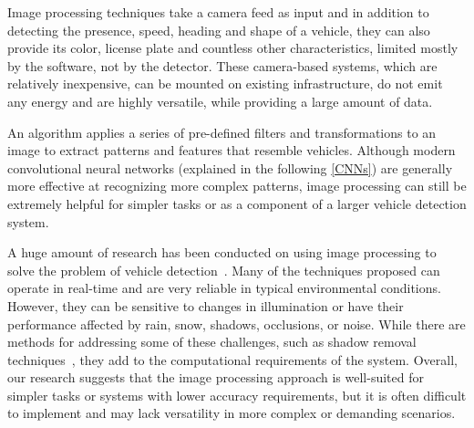 





Image processing techniques take a camera feed as input and in addition to
detecting the presence, speed, heading and shape of a vehicle, they can also
provide its color, license plate and countless other characteristics, limited
mostly by the software, not by the detector. These camera-based systems, which
are relatively inexpensive, can be mounted on existing infrastructure, do not
emit any energy and are highly versatile, while providing a large amount of
data.

An algorithm applies a series of pre-defined filters and transformations to an
image to extract patterns and features that resemble vehicles. Although modern
convolutional neural networks (explained in the following \autoref{CNNs}) are
generally more effective at recognizing more complex patterns, image processing
can still be extremely helpful for simpler tasks or as a component of a larger
vehicle detection system.

A huge amount of research has been conducted on using image processing to solve
the problem of vehicle detection~\cite{ImageProcessingOverview}. Many of the
techniques proposed can operate in real-time and are very reliable in typical
environmental conditions. However, they can be sensitive to changes in
illumination or have their performance affected by rain, snow, shadows,
occlusions, or noise. While there are methods for addressing some of these
challenges, such as shadow removal techniques~\cite{ShadowRemoval}, they add to
the computational requirements of the system. Overall, our research suggests
that the image processing approach is well-suited for simpler tasks or systems
with lower accuracy requirements, but it is often difficult to implement and may
lack versatility in more complex or demanding scenarios.



